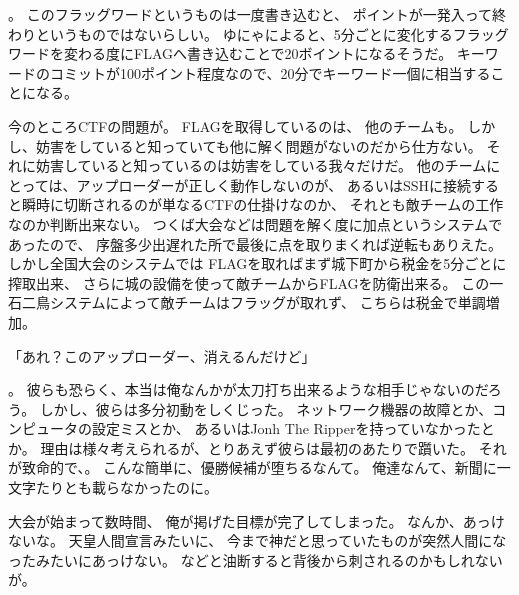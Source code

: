 。
このフラッグワードというものは一度書き込むと、
ポイントが一発入って終わりというものではないらしい。
ゆにゃによると、5分ごとに変化するフラッグワードを変わる度にFLAGへ書き込むことで20ボイントになるそうだ。
キーワードのコミットが100ポイント程度なので、20分でキーワード一個に相当することになる。

今のところCTFの問題が。
FLAGを取得しているのは、
他のチームも。
しかし、妨害をしていると知っていても他に解く問題がないのだから仕方ない。
それに妨害していると知っているのは妨害をしている我々だけだ。
他のチームにとっては、アップローダーが正しく動作しないのが、
あるいはSSHに接続すると瞬時に切断されるのが単なるCTFの仕掛けなのか、
それとも敵チームの工作なのか判断出来ない。
つくば大会などは問題を解く度に加点というシステムであったので、
序盤多少出遅れた所で最後に点を取りまくれば逆転もありえた。
しかし全国大会のシステムでは%
FLAGを取ればまず城下町から税金を5分ごとに搾取出来、
さらに城の設備を使って敵チームからFLAGを防衛出来る。
この一石二鳥システムによって敵チームはフラッグが取れず、
こちらは税金で単調増加。

「あれ？このアップローダー、消えるんだけど」

。
彼らも恐らく、本当は俺なんかが太刀打ち出来るような相手じゃないのだろう。
しかし、彼らは多分初動をしくじった。
ネットワーク機器の故障とか、コンピュータの設定ミスとか、
あるいはJonh The Ripperを持っていなかったとか。
理由は様々考えられるが、とりあえず彼らは最初のあたりで躓いた。
それが致命的で、。
こんな簡単に、優勝候補が堕ちるなんて。
俺達なんて、新聞に一文字たりとも載らなかったのに。

大会が始まって数時間、
俺が掲げた目標が完了してしまった。
なんか、あっけないな。
天皇人間宣言みたいに、
今まで神だと思っていたものが突然人間になったみたいにあっけない。
などと油断すると背後から刺されるのかもしれないが。

